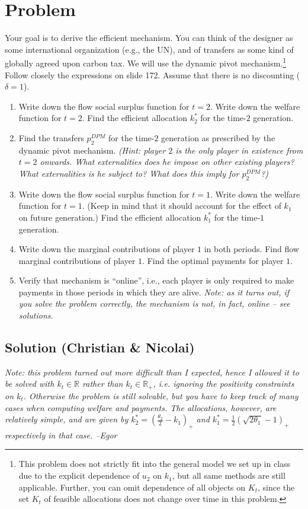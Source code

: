 \documentclass{article}
\newcommand{\enterProblemHeader}[1]{
	\nobreak\extramarks{#1}{#1 continued on next page\ldots}\nobreak
	\nobreak\extramarks{#1 (continued)}{#1 continued on next page\ldots}\nobreak
}
\newcommand{\exitProblemHeader}[1]{
	\nobreak\extramarks{#1 (continued)}{#1 continued on next page\ldots}\nobreak
	\nobreak\extramarks{#1}{}\nobreak
}
\newcounter{homeworkProblemCounter} %
\newcommand{\homeworkProblemName}{}
\newenvironment{ex}[1][Problem \arabic{homeworkProblemCounter}]{ %
	\stepcounter{homeworkProblemCounter} %
	\renewcommand{\homeworkProblemName}{#1} %
	\section{\homeworkProblemName} %
}{
}
\newif\ifsolutions
\begin{document}
\begin{ex}
	Your goal is to derive the efficient mechanism. You can think of the designer as some international organization (e.g., the UN), and of transfers as some kind of globally agreed upon carbon tax. We will use the dynamic pivot mechanism.\footnote{This problem does not strictly fit into the general model we set up in class due to the explicit dependence of $u_2$ on $k_1$, but all same methods are still applicable. Further, you can omit dependence of all objects on $K_t$, since the set $K_t$ of feasible allocations does not change over time in this problem.}
	Follow closely the expressions on slide 172. Assume that there is no discounting ($\delta = 1$).
	\begin{enumerate}
		\item Write down the flow social surplus function for $t=2$. Write down the welfare function for $t=2$. Find the efficient allocation $k^*_2$ for the time-$2$ generation.
		\item Find the transfers $p^{DPM}_2$ for the time-$2$ generation as prescribed by the dynamic pivot mechanism. \emph{(Hint: player $2$ is the only player in existence from $t=2$ onwards. What externalities does he impose on other existing players? What externalities is he subject to? What does this imply for $p^{DPM}_2$?)}
		\item Write down the flow social surplus function for $t=1$. Write down the welfare function for $t=1$. (Keep in mind that it should account for the effect of $k_1$ on future generation.) Find the efficient allocation $k^*_1$ for the time-$1$ generation.
		\item Write down the marginal contributions of player $1$ in both periods. Find flow marginal contributions of player $1$. Find the optimal payments for player $1$.
		\item Verify that mechanism is ``online'', i.e., each player is only required to make payments in those periods in which they are alive.
		\emph{Note: as it turns out, if you solve the problem correctly, the mechanism is not, in fact, online -- see solutions.}
	\end{enumerate}
	
	\ifsolutions
	\subsection*{Solution (Christian \& Nicolai)}
	
	\emph{Note: this problem turned out more difficult than I expected, hence I allowed it to be solved with $k_t \in \mathbb{R}$ rather than $k_t \in \mathbb{R_+}$, i.e. ignoring the positivity constraints on $k_t$. Otherwise the problem is still solvable, but you have to keep track of many cases when computing welfare and payments. The allocations, however, are relatively simple, and are given by $k_2^* = (\frac{\theta_2}{2} - k_1)_+$ and $k_1^* = \frac{1}{2} \left( \sqrt{2 \theta_1} - 1 \right)_+$ respectively in that case. --Egor}
	

\end{ex}
\end{document}
